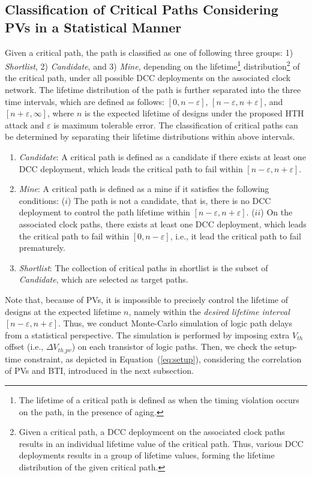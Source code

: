 \subsection{Classification of Critical Paths Considering PVs in a Statistical Manner}
\label{sec:frame:cp}
Given a critical path, the path is classified as one of following three groups: 1) \textit{Shortlist}, 2) \textit{Candidate}, and 3) \textit{Mine}, depending on the lifetime\footnote{The lifetime of a critical path is defined as when the timing violation occurs on the path, in the presence of aging.} distribution\footnote{Given a critical path, a DCC deploymcent on the associated clock paths results in an individual lifetime value of the critical path. Thus, various DCC deployments results in a group of lifetime values, forming the lifetime distribution of the given critical path.} of the critical path, under all possible DCC deployments on the associated clock network. The lifetime distribution of the path is further separated into the three time intervals, which are defined as follows: $[0, n - \varepsilon]$, $[n - \varepsilon, n + \varepsilon]$, and $[n + \varepsilon, \infty]$, where $n$ is the expected lifetime of designs under the proposed HTH attack and $\varepsilon$ is maximum tolerable error. The classification of critical paths can be determined by separating their lifetime distributions within above intervals. 
\begin{enumerate}[leftmargin=*]
	\item \textit{Candidate}: A critical path is defined as a candidate if there exists at least one DCC deployment, which leads the critical path to fail within $[n - \varepsilon, n + \varepsilon]$.
	\item \textit{Mine}: A critical path is defined as a mine if it satisfies the following conditions: ($i$) The path is not a candidate, that is, there is no DCC deployment to control the path lifetime within $[n - \varepsilon, n + \varepsilon]$. ($ii$) On the associated clock paths, there exists at least one DCC deployment, which leads the critical path to fail within $[0, n - \varepsilon]$, i.e., it lead the critical path to fail prematurely.
	\item \textit{Shortlist}:  The collection of critical paths in shortlist is the subset of \textit{Candidate}, which are selected as target paths.
\end{enumerate}

Note that, because of PVs, it is impossible to precisely control the lifetime of designs at the expected lifetime $n$, namely within the \textit{desired lifetime interval}  $[n - \varepsilon, n + \varepsilon]$. Thus, we conduct Monte-Carlo simulation of logic path delays from a statistical perspective. The simulation is performed by imposing extra $V_{th}$ offset (i.e., $\Delta V_{th\_pv}$) on each transistor of logic paths. Then, we check the setup-time constraint, as depicted in Equation~(\ref{eq:setup}), considering the correlation of PVs and BTI, introduced in the next subsection. 

